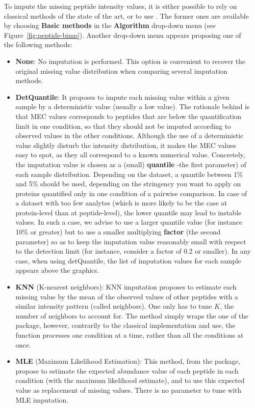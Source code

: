 \documentclass[12pt]{article}
\begin{document}
To impute the missing peptide intensity values, it is either possible to rely on
classical methods of the state of the art, or to use . The former
ones are available by choosing \textbf{Basic methods} in the \textbf{Algorithm} 
drop-down menu (see Figure~\ref{fig:peptide-bimp}). Another drop-down menu appears proposing one of the following methods:
\begin{itemize}
	\item \textbf{None}: No imputation is performed. This option is convenient to recover the original missing value distribution when comparing several imputation methods.
	\item \textbf{DetQuantile}: It proposes to impute each missing value within a given sample by a deterministic value (usually a low value). The rationale behind is that MEC values corresponds to peptides that are below the quantification limit in one condition, so that they should not be imputed according to observed values in the other conditions. Although the use of a deterministic value slightly disturb the intensity distribution, it makes the MEC values easy to spot, as they all correspond to a known numerical value. Concretely, the imputation value is chosen as a (small) \textbf{quantile} -the first parameter) of each sample distribution. Depending on the dataset, a quantile between 1\% and 5\% should be used, depending on the stringency you want to apply on proteins quantified only in one condition of a pairwise comparison. In case of a dataset with too few analytes (which is more likely to be the case at protein-level than at peptide-level), the lower quantile may lead to instable values. In such a case, we advise to use a larger quantile value (for instance 10\% or greater) but to use a smaller multiplying \textbf{factor} (the second parameter) so as to keep the imputation value reasonably small with respect to the detection limit (for instance, consider a factor of 0.2 or smaller). In any case, when using detQuantile, the list of imputation values for each sample appears above the graphics.
	\item \textbf{KNN} (K-nearest neighbors):  KNN imputation proposes to estimate each missing value by the mean of the observed values of other peptides with a similar intensity pattern (called neighbors). One only has to tune $K$, the number of neighbors to account for. The method simply wraps the one of the  package, however, contrarily to the classical implementation and use, the function processes one condition at a time, rather than all the conditions at once. 
	\item \textbf{MLE} (Maximum Likelihood Estimation): This method, from the  package, propose to estimate the expected abundance value of each peptide in each condition (with the maximum likelihood estimate), and to use this expected value as replacement of missing values. There is no parameter to tune with MLE imputation.
\end{itemize}
\end{document}

